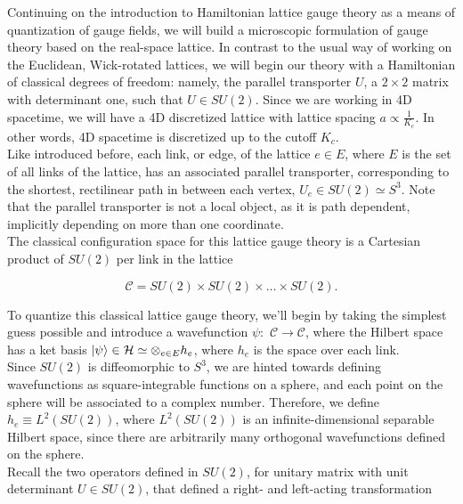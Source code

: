 
\noindent Continuing on the introduction to Hamiltonian lattice gauge theory as a means of quantization of gauge fields, we will build a microscopic formulation of gauge theory based on the real-space lattice. In contrast to the usual way of working on the Euclidean, Wick-rotated lattices, we will begin our theory with a Hamiltonian of classical degrees of freedom: namely, the parallel transporter $U$, a $2 \times 2$ matrix with determinant one, such that $U \in SU(2)$. Since we are working in 4D spacetime, we will have a 4D discretized lattice with lattice spacing $a \propto \frac{1}{K_c}$. In other words, 4D spacetime is discretized up to the cutoff $K_c$. \\ 

\noindent Like introduced before, each link, or edge, of the lattice $e \in E$, where $E$ is the set of all links of the lattice, has an associated parallel transporter, corresponding to the shortest, rectilinear path in between each vertex, $U_e \in SU(2) \simeq S^3$. Note that the parallel transporter is not a local object, as it is path dependent, implicitly depending on more than one coordinate. \\

\noindent The classical configuration space for this lattice gauge theory is a Cartesian product of $SU(2)$ per link in the lattice

\begin{equation}
\mathcal{C} = SU(2) \times SU(2) \times \dots \times SU(2).
\end{equation}

\noindent To quantize this classical lattice gauge theory, we'll begin by taking the simplest guess possible and introduce a wavefunction $\psi: \,\, \mathcal{C} \rightarrow \mathcal{C}$, where the Hilbert space has a ket basis $\ket{\psi} \in \mathcal{H} \simeq \otimes_{e \in E} h_e$, where $h_e$ is the space over each link. \\

\noindent Since $SU(2)$ is diffeomorphic to $S^3$, we are hinted towards defining wavefunctions as square-integrable functions on a sphere, and each point on the sphere will be associated to a complex number. Therefore, we define $h_e \equiv L^2(SU(2))$, where $L^2(SU(2))$ is an infinite-dimensional separable Hilbert space, since there are arbitrarily many orthogonal wavefunctions defined on the sphere. \\

\noindent Recall the two operators defined in $SU(2)$, for unitary matrix with unit determinant $U \in SU(2)$, that defined a right- and left-acting transformation

